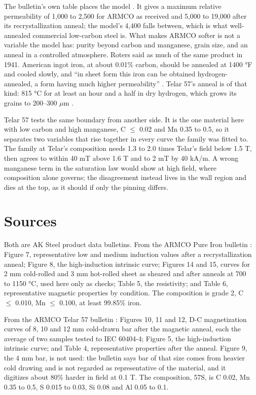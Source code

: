 \documentclass[
  11pt,
]{article}
\begin{document}
The bulletin's own table places the model \cite{armco-iron}. It gives a maximum relative permeability of 1,000 to 2,500 for ARMCO as received and 5,000 to 19,000 after its recrystallization anneal; the model's 4,400 falls between, which is what well-annealed commercial low-carbon steel is. What makes ARMCO softer is not a variable the model has: purity beyond carbon and manganese, grain size, and an anneal in a controlled atmosphere. Roters said as much of the same product in 1941. American ingot iron, at about 0.01\% carbon, should be annealed at 1400 °F and cooled slowly, and ``in sheet form this iron can be obtained hydrogen-annealed, a form having much higher permeability'' \cite{roters1941}. Telar 57's anneal is of that kind: 815 °C for at least an hour and a half in dry hydrogen, which grows its grains to 200--300 \(\mu\)m \cite{armco-telar}.

Telar 57 tests the same boundary from another side. It is the one material here with low carbon and high manganese, C \(\le\) 0.02 and Mn 0.35 to 0.5, so it separates two variables that rise together in every curve the family was fitted to. The family at Telar's composition needs 1.3 to 2.0 times Telar's field below 1.5 T, then agrees to within 40 mT above 1.6 T and to 2 mT by 40 kA/m. A wrong manganese term in the saturation law would show at high field, where composition alone governs; the disagreement instead lives in the wall region and dies at the top, as it should if only the pinning differs.

\section{Sources}\label{sources}

Both are AK Steel product data bulletins. From the ARMCO Pure Iron bulletin \cite{armco-iron}: Figure 7, representative low and medium induction values after a recrystallization anneal; Figure 8, the high-induction intrinsic curve; Figures 14 and 15, curves for 2 mm cold-rolled and 3 mm hot-rolled sheet as sheared and after anneals at 700 to 1150 °C, used here only as checks; Table 5, the resistivity; and Table 6, representative magnetic properties by condition. The composition is grade 2, C \(\le\) 0.010, Mn \(\le\) 0.100, at least 99.85\% iron.

From the ARMCO Telar 57 bulletin \cite{armco-telar}: Figures 10, 11 and 12, D-C magnetization curves of 8, 10 and 12 mm cold-drawn bar after the magnetic anneal, each the average of two samples tested to IEC 60404-4; Figure 5, the high-induction intrinsic curve; and Table 4, representative properties after the anneal. Figure 9, the 4 mm bar, is not used: the bulletin says bar of that size comes from heavier cold drawing and is not regarded as representative of the material, and it digitizes about 80\% harder in field at 0.1 T. The composition, 57S, is C 0.02, Mn 0.35 to 0.5, S 0.015 to 0.03, Si 0.08 and Al 0.05 to 0.1.
\end{document}

